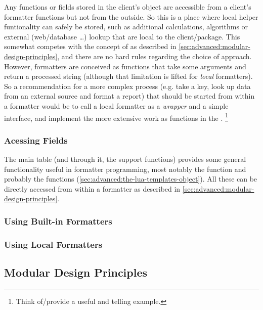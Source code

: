 \documentclass[12pt]{scrartcl}
\begin{document}
Any functions or fields stored in the client's  object
are accessible from a client's formatter functions but not from the outside.  So
this is a place where local helper funtionality can safely be stored, such as
additional calculations, algorithms or external (web/database \dots) lookup that
are local to the client/package.  This somewhat competes with the concept of
 as described in
\vref{sec:advanced:modular-design-principles}, and there are no hard rules
regarding the choice of approach.  However, formatters are conceived as
functions that take some arguments and return a processed string (although that
limitation is lifted for \emph{local} formatters).  So a recommendation for a
more complex process (e.g. take a key, look up data from an external source and
format a report) that should be started from within a formatter would be to call
a local formatter as a \emph{wrapper} and a simple interface, and implement the
more extensive work as functions in the .%
\footnote{ Think of/provide a useful and telling example.}


\subsubsection{Acessing  Fields}
\label{sec:advanced:reuse:lua-templates-fields}

The main table  (and through it, the support functions)
provides some general functionality useful in formatter programming, most
notably the  function and probably the 
functions (\vref{sec:advanced:the-lua-templates-object}).  All these can be
directly accessed from within a formatter as described in
\vref{sec:advanced:modular-design-principles}.


\subsubsection{Using Built-in Formatters}
\label{sec:advanced:reuse:builtin-formatters}


\subsubsection{Using Local Formatters}
\label{sec:advanced:reuse:loal-formatters}

\subsection{Modular Design Principles}
\label{sec:advanced:modular-design-principles}
\end{document}
